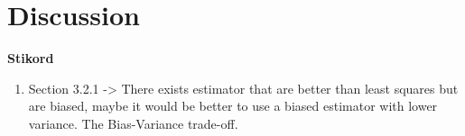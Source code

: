 \chapter{Discussion}

\textbf{Stikord}
\begin{enumerate}
    \item Section 3.2.1 -> There exists estimator that are better than least squares but are biased, maybe it would be better to use a biased estimator with lower variance. The Bias-Variance trade-off. 
\end{enumerate}